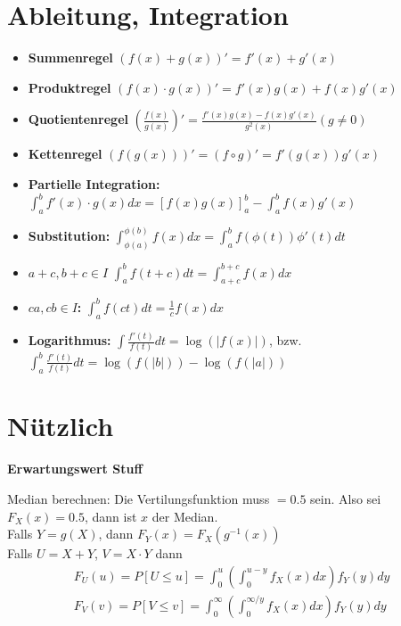 \section{Ableitung, Integration}

\begin{itemize}
 	\item \textbf{Summenregel} $(f(x)+g(x))' = f'(x) + g'(x)$
    \item \textbf{Produktregel} $(f(x)\cdot g(x))' = f'(x)g(x) + f(x)g'(x)$
    \item \textbf{Quotientenregel} $\left(\frac{f(x)}{g(x)}\right)' = \frac{f'(x)g(x) - f(x)g'(x)}{g^2(x)}(g\neq 0)$
    \item \textbf{Kettenregel} $(f(g(x)))' = (f\circ g)' = f'(g(x))g'(x)$
\end{itemize}

\begin{itemize}
  \item \textbf{Partielle Integration:} $\int_a^b f'(x)\cdot g(x)dx = \left[f(x)g(x)\right]_a^b - \int_a^b f(x)g'(x)$
  \item \textbf{Substitution:} $\int_{\phi(a)}^{\phi(b)} f(x)dx = \int_a^b f(\phi(t))\phi '(t) dt$
  \item \textbf{$a+c, b+c \in I$} $\int_a^b f(t+c)dt = \int_{a+c}^{b+c} f(x)dx$
  \item \textbf{$ca,cb\in I$: } $\int_a^b f(ct)dt = \frac{1}{c}f(x)dx$
  \item \textbf{Logarithmus: }$\int\frac{f'(t)}{f(t)}dt = \log(|f(x)|)$, bzw. $\int_a^b\frac{f'(t)}{f(t)}dt = \log(f(|b|)) - \log(f(|a|))$
\end{itemize}

\section{Nützlich}

\textbf{Erwartungswert Stuff}



Median berechnen: Die Vertilungsfunktion muss $= 0.5$ sein. Also sei $F_X(x) = 0.5$, dann ist $x$ der Median.\\

Falls $Y = g(X)$, dann $F_Y(x) = F_X(g^{-1}(x))$\\
Falls $U = X + Y$, $V = X \cdot Y$ dann
\begin{align*}
	F_U(u) = P[U \leq u] = \int_0^u \left(\int_0^{u-y}f_X(x) dx\right)f_Y(y) dy\\
	F_V(v) = P[V \leq v] = \int_0^\infty \left(\int_0^{\infty/y}f_X(x) dx\right)f_Y(y) dy
\end{align*}

